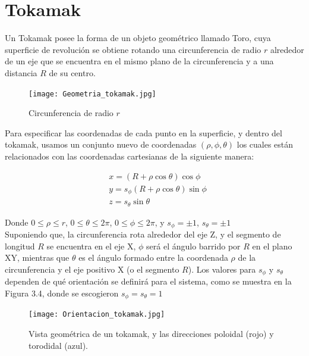 \documentclass[../main.tex]{subfiles}
\begin{document}
    \section{Tokamak}

	    Un Tokamak posee la forma de un objeto geométrico llamado Toro, cuya superficie de revolución se obtiene rotando una circunferencia de 
        radio $r$ alrededor de un eje que se encuentra en el mismo plano de la circunferencia y a una distancia $R$ de su centro.

        \begin{figure}[h]
        \caption{Circunferencia de radio $r$}
        \centering
        \texttt{[image: Geometria\_tokamak.jpg]}
        \end{figure}

        Para especificar las coordenadas de cada punto en la superficie, y dentro del tokamak, usamos un conjunto nuevo de coordenadas
        $(\rho, \phi, \theta)$ los cuales están relacionados con las coordenadas cartesianas de la siguiente manera:

        \begin{align}
            &x = \left( R  + \rho\cos\theta \right)\cos\phi \\
            &y = s_{\phi} \left( R  + \rho\cos\theta \right)\sin\phi \\
            &z = s_{\theta} \sin\theta
        \end{align}

        Donde $0 \leq \rho \leq r$, $0 \leq \theta \leq 2\pi$, $0 \leq \phi \leq 2\pi$, y $s_{\phi} = \pm 1$, $s_{\theta} = \pm 1$ \\

        Suponiendo que, la circunferencia rota alrededor del eje Z, y el segmento de longitud $R$ se encuentra en el eje X, $\phi$ será 
        el ángulo barrido por $R$ en el plano XY, mientras que $\theta$ es el ángulo formado entre la coordenada $\rho$ de la circunferencia
        y el eje positivo X (o el segmento $R$). Los valores para $s_{\phi}$ y $s_{\theta}$ dependen de qué orientación se definirá para 
        el sistema, como se muestra en la Figura 3.4, donde se escogieron $s_{\phi} = s_{\theta} = 1$ \\ 

        \begin{figure}[h]
        \centering
        \texttt{[image: Orientacion\_tokamak.jpg]}
        \caption{Vista geométrica de un tokamak, y las direcciones poloidal (rojo) y torodidal (azul).}
        \end{figure}
\end{document}
